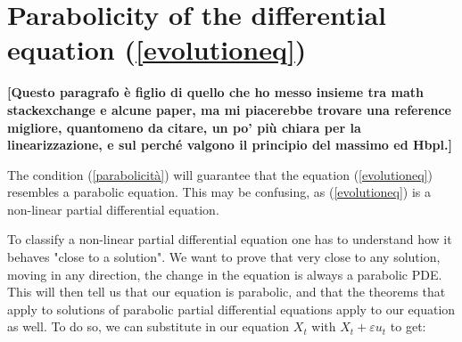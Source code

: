 \section{Parabolicity of the differential equation (\ref{evolutioneq})}\label{parabolic}

{\vspace{10pt}\LARGE \bf [Questo paragrafo è figlio di quello che ho messo insieme tra math stackexchange e alcune paper, ma mi piacerebbe trovare una reference migliore, quantomeno da citare, un po' più chiara per la linearizzazione, e sul perché valgono il principio del massimo ed Hbpl.]}

The condition (\ref{parabolicità}) will  guarantee that the equation (\ref{evolutioneq}) resembles a parabolic equation. This may be confusing, as (\ref{evolutioneq}) is a non-linear partial differential equation. 

To classify a non-linear partial differential equation one has to understand how it behaves "close to a solution". We want to prove that very close to any solution, moving in any direction, the change in the equation is always a parabolic PDE. This will then tell us that our equation is parabolic, and that the theorems that apply to solutions of parabolic partial differential equations apply to our equation as well. To do so, we can substitute in our equation $X_t$ with $X_t+\varepsilon u_t$ to get:

